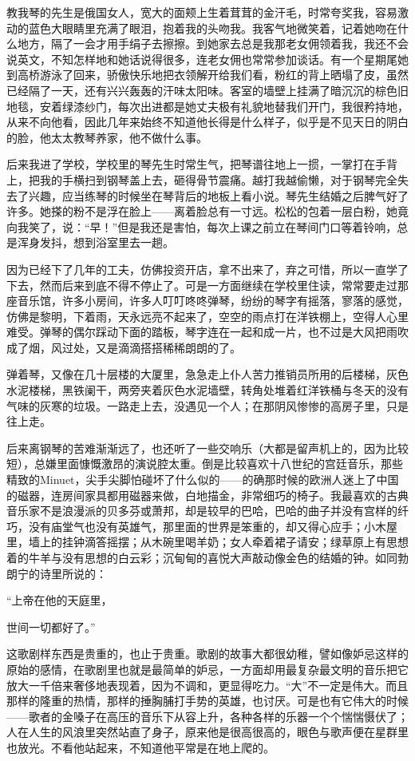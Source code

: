 \par 教我琴的先生是俄国女人，宽大的面颊上生着茸茸的金汗毛，时常夸奖我，容易激动的蓝色大眼睛里充满了眼泪，抱着我的头吻我。我客气地微笑着，记着她吻在什么地方，隔了一会才用手绢子去擦擦。到她家去总是我那老女佣领着我，我还不会说英文，不知怎样地和她话说得很多，连老女佣也常常参加谈话。有一个星期尾她到高桥游泳了回来，骄傲快乐地把衣领解开给我们看，粉红的背上晒塌了皮，虽然已经隔了一天，还有兴兴轰轰的汗味太阳味。客室的墙壁上挂满了暗沉沉的棕色旧地毯，安着绿漆纱门，每次出进都是她丈夫极有礼貌地替我们开门，我很矜持地，从来不向他看，因此几年来始终不知道他长得是什么样子，似乎是不见天日的阴白的脸，他太太教琴养家，他不做什么事。
\par 后来我进了学校，学校里的琴先生时常生气，把琴谱往地上一掼，一掌打在手背上，把我的手横扫到钢琴盖上去，砸得骨节震痛。越打我越偷懒，对于钢琴完全失去了兴趣，应当练琴的时候坐在琴背后的地板上看小说。琴先生结婚之后脾气好了许多。她搽的粉不是浮在脸上——离着脸总有一寸远。松松的包着一层白粉，她竟向我笑了，说：“早！”但是我还是害怕，每次上课之前立在琴间门口等着铃响，总是浑身发抖，想到浴室里去一趟。
\par 因为已经下了几年的工夫，仿佛投资开店，拿不出来了，弃之可惜，所以一直学了下去，然而后来到底不得不停止了。可是一方面继续在学校里住读，常常要走过那座音乐馆，许多小房间，许多人叮叮咚咚弹琴，纷纷的琴字有摇落，寥落的感觉，仿佛是黎明，下着雨，天永远亮不起来了，空空的雨点打在洋铁棚上，空得人心里难受。弹琴的偶尔踩动下面的踏板，琴字连在一起和成一片，也不过是大风把雨吹成了烟，风过处，又是滴滴搭搭稀稀朗朗的了。
\par 弹着琴，又像在几十层楼的大厦里，急急走上仆人苦力推销员所用的后楼梯，灰色水泥楼梯，黑铁阑干，两旁夹着灰色水泥墙壁，转角处堆着红洋铁桶与冬天的没有气味的灰寒的垃圾。一路走上去，没遇见一个人；在那阴风惨惨的高房子里，只是往上走。
\par 后来离钢琴的苦难渐渐远了，也还听了一些交响乐（大都是留声机上的，因为比较短），总嫌里面慷慨激昂的演说腔太重。倒是比较喜欢十八世纪的宫廷音乐，那些精致的Minuet，尖手尖脚怕碰坏了什么似的——的确那时候的欧洲人迷上了中国的磁器，连房间家具都用磁器来做，白地描金，非常细巧的椅子。我最喜欢的古典音乐家不是浪漫派的贝多芬或萧邦，却是较早的巴哈，巴哈的曲子并没有宫样的纤巧，没有庙堂气也没有英雄气，那里面的世界是笨重的，却又得心应手；小木屋里，墙上的挂钟滴答摇摆；从木碗里喝羊奶；女人牵着裙子请安；绿草原上有思想着的牛羊与没有思想的白云彩；沉甸甸的喜悦大声敲动像金色的结婚的钟。如同勃朗宁的诗里所说的：
\par “上帝在他的天庭里，
\par 世间一切都好了。”
\par 这歌剧样东西是贵重的，也止于贵重。歌剧的故事大都很幼稚，譬如像妒忌这样的原始的感情，在歌剧里也就是最简单的妒忌，一方面却用最复杂最文明的音乐把它放大一千倍来奢侈地表现着，因为不调和，更显得吃力。“大”不一定是伟大。而且那样的隆重的热情，那样的捶胸脯打手势的英雄，也讨厌。可是也有它伟大的时候——歌者的金嗓子在高压的音乐下从容上升，各种各样的乐器一个个惴惴慑伏了；人在人生的风浪里突然站直了身子，原来他是很高很高的，眼色与歌声便在星群里也放光。不看他站起来，不知道他平常是在地上爬的。
